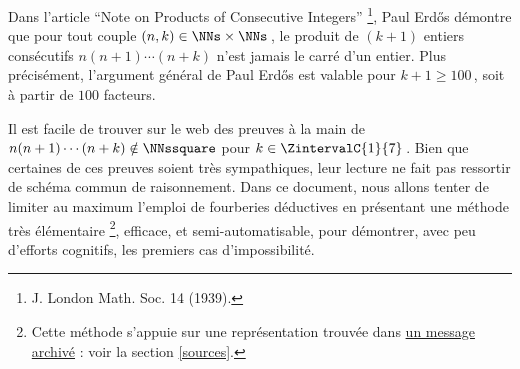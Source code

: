 Dans l'article \enquote{Note on Products of Consecutive Integers}
\footnote{
	J. London Math. Soc. 14 (1939).
},
Paul Erdős démontre que pour tout couple $(n, k) \in \NNs \times \NNs$\,, le produit de $(k+1)$ entiers consécutifs $n (n + 1) \cdots (n + k)$ n'est jamais le carré d'un entier.
Plus précisément, l'argument général de Paul Erdős est valable pour $k + 1 \geq 100$\,, soit à partir de $100$ facteurs.

\smallskip

Il est facile de trouver sur le web des preuves à la main de $n(n+1) \cdots (n + k) \notin \NNssquare$ pour $k \in \ZintervalC{1}{7}$\,.
Bien que certaines de ces preuves soient très sympathiques, leur lecture ne fait pas ressortir de schéma commun de raisonnement.
%
Dans ce document, nous allons tenter de limiter au maximum l'emploi de fourberies déductives en présentant une méthode très élémentaire
\footnote{
	Cette méthode s'appuie sur une représentation trouvée dans \href{https://web.archive.org/web/20171110144534/http://mathforum.org/library/drmath/view/65589.html}{un message archivé} : voir la section \ref{sources}.
},
efficace, et semi-automatisable, pour démontrer, avec peu d'efforts cognitifs, les premiers cas d'impossibilité.
